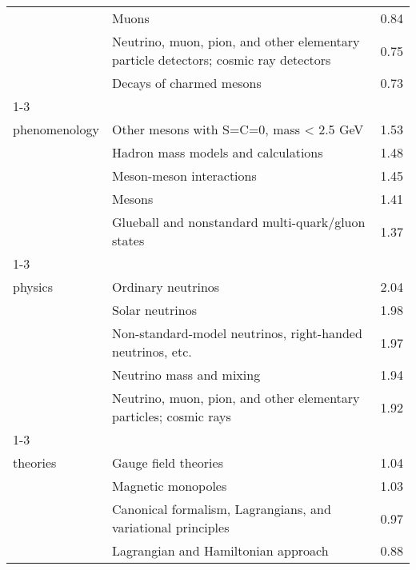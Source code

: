 \begin{longtable}[H]{p{}|p{}|p{}}
                                        & Muons &  0.84 \\
                                        & Neutrino, muon, pion, and other elementary particle detectors; cosmic ray detectors &  0.75 \\
                                        & Decays of charmed mesons &  0.73 \\
\cline{1-3}
\multirow{5}{*}{\begin{tabular}{l}Meson\\ phenomenology\end{tabular}} & Other mesons with S=C=0, mass < 2.5 GeV &  1.53 \\
                                        & Hadron mass models and calculations &  1.48 \\
                                        & Meson-meson interactions &  1.45 \\
                                        & Mesons &  1.41 \\
                                        & Glueball and nonstandard multi-quark/gluon states &  1.37 \\
\cline{1-3}
\multirow{5}{*}{\begin{tabular}{l}Neutrino\\ physics\end{tabular}} & Ordinary neutrinos &  2.04 \\
                                        & Solar neutrinos &  1.98 \\
                                        & Non-standard-model neutrinos, right-handed neutrinos, etc. &  1.97 \\
                                        & Neutrino mass and mixing &  1.94 \\
                                        & Neutrino, muon, pion, and other elementary particles; cosmic rays &  1.92 \\
\cline{1-3}
\multirow{5}{*}{\begin{tabular}{l}Non-abelian\\ theories\end{tabular}} & Gauge field theories &  1.04 \\
                                        & Magnetic monopoles &  1.03 \\
                                        & Canonical formalism, Lagrangians, and variational principles &  0.97 \\
                                        & Lagrangian and Hamiltonian approach &  0.88 \\

\end{longtable}
